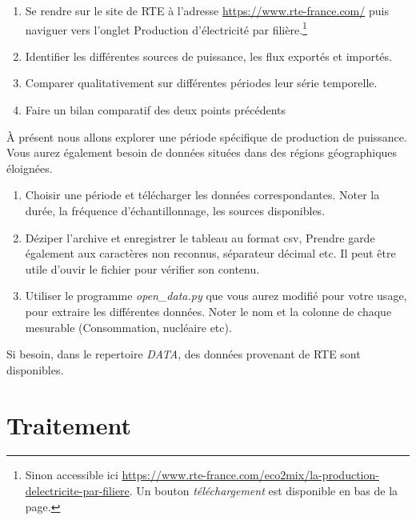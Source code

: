 \documentclass[12pt,a4]{article}
\newcommand{\tmtextit}[1]{{\itshape{#1}}}
\begin{document}
\begin{enumerate}
  \item Se rendre sur le site de RTE à l'adresse 
  \href{https://www.rte-france.com/}{https://www.rte-france.com/} puis naviguer vers l'onglet Production d'électricité par filière.\footnote{Sinon accessible ici \href{https://www.rte-france.com/eco2mix/la-production-delectricite-par-filiere}{https://www.rte-france.com/eco2mix/la-production-delectricite-par-filiere}. Un bouton \textit{téléchargement} est disponible en bas de la page.}
  
  \item Identifier les différentes sources de puissance, les flux exportés et importés.
  
  \item  Comparer qualitativement sur différentes périodes leur série temporelle.
  
  \item Faire un bilan comparatif des deux points précédents
\end{enumerate}

À présent nous allons explorer une période spécifique de production de puissance. Vous aurez également besoin de données situées dans des régions géographiques éloignées.
  
\begin{enumerate}  
  \item Choisir une période et télécharger les données
  correspondantes. Noter la durée, la fréquence d'échantillonnage, les
  sources disponibles. 
  
  \item Déziper l'archive et enregistrer le
  tableau au format csv, Prendre garde également aux caractères non   reconnus, séparateur décimal etc. Il peut être utile d'ouvir le fichier pour vérifier son contenu.
  
  \item Utiliser le programme \tmtextit{open\_data.py} que vous aurez modifié
  pour votre usage, pour extraire les différentes données. Noter le nom et
  la colonne de chaque mesurable (Consommation, nucléaire etc). 
  
\end{enumerate}


Si besoin, dans le repertoire \tmtextit{DATA}, des données provenant de RTE sont
disponibles.


\part{Traitement}
\end{document}
